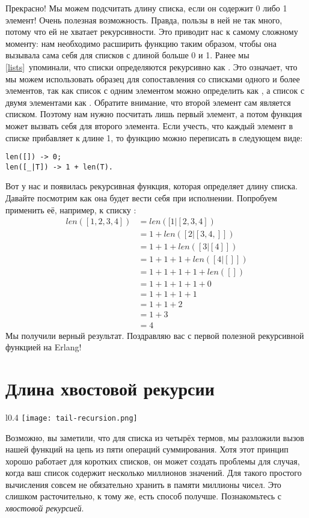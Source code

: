 Прекрасно!
Мы можем подсчитать длину списка, если он содержит 0 либо 1 элемент!
Очень полезная возможность.
Правда, пользы в ней не так много, потому что ей не хватает рекурсивности.
Это приводит нас к самому сложному моменту: нам необходимо расширить функцию таким образом, чтобы она вызывала сама себя для списков с длиной больше 0 и 1.
Ранее мы \ref{lists}~упоминали, что списки определяются рекурсивно как .
Это означает, что мы можем использовать образец \ops{[H|T]} для сопоставления со списками одного и более элементов, так как список с одним элементом можно определить как \ops{[X|[]]}, а список с двумя элементами как .
Обратите внимание, что второй элемент сам является списком.
Поэтому нам нужно посчитать лишь первый элемент, а потом функция может вызвать себя для второго элемента.
Если учесть, что каждый элемент в списке прибавляет к длине 1, то функцию можно переписать в следующем виде:
\begin{lstlisting}[style=erlang]
len([]) -> 0;
len([_|T]) -> 1 + len(T).
\end{lstlisting}

Вот у нас и появилась рекурсивная функция, которая определяет длину списка.
Давайте посмотрим как она будет вести себя при исполнении. Попробуем применить её, например, к списку \ops{[1,2,3,4]}: \begin{align*}
len([1,2,3,4]) &= len([1 | [2,3,4])\\
&= 1 + len([2 | [3,4,]])\\
&= 1 + 1 + len([3 | [4]])\\
&= 1 + 1 + 1 + len([4 | []])\\
&= 1 + 1 + 1 + 1 + len([])\\
&= 1 + 1 + 1 + 1 + 0\\
&= 1 + 1 + 1 + 1\\
&= 1 + 1 + 2\\
&= 1 + 3\\
&= 4
\end{align*}
Мы получили верный результат.
Поздравляю вас с первой полезной рекурсивной функцией на Erlang!
\section{Длина хвостовой рекурсии}
\label{length-of-a-tail-recursion}

\begin{wrapfigure}{l}{0.4\linewidth}
    \texttt{[image: tail-recursion.png]}
\end{wrapfigure}
Возможно, вы заметили, что для списка из четырёх термов, мы разложили вызов нашей функций на цепь из пяти операций суммирования.
Хотя этот принцип хорошо работает для коротких списков, он может создать проблемы для случая, когда ваш список содержит несколько миллионов значений.
Для такого простого вычисления совсем не обязательно хранить в памяти миллионы чисел.
Это слишком расточительно, к тому же, есть способ получше.
Познакомьтесь с \emph{хвостовой рекурсией}.


